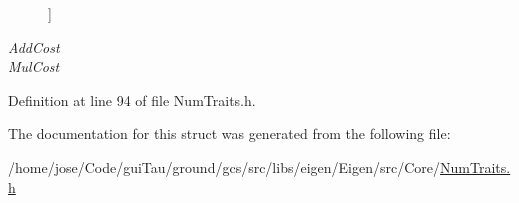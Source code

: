 \begin{Desc}
\begin{description}
{}]\item[{\em 
\hypertarget{struct_num_traits_3_01std_1_1complex_3_01___real_01_4_01_4_a871ff18c5ca0e6b22d90410aaf6b96c4a10d14e7883002df66df773824785c86b}{Add\-Cost}\label{struct_num_traits_3_01std_1_1complex_3_01___real_01_4_01_4_a871ff18c5ca0e6b22d90410aaf6b96c4a10d14e7883002df66df773824785c86b}
}]\item[{\em 
\hypertarget{struct_num_traits_3_01std_1_1complex_3_01___real_01_4_01_4_a871ff18c5ca0e6b22d90410aaf6b96c4a4adb121abc42ede778cae2652809088a}{Mul\-Cost}\label{struct_num_traits_3_01std_1_1complex_3_01___real_01_4_01_4_a871ff18c5ca0e6b22d90410aaf6b96c4a4adb121abc42ede778cae2652809088a}
}]\end{description}
\end{Desc}


Definition at line 94 of file Num\-Traits.\-h.



The documentation for this struct was generated from the following file\-:\begin{DoxyCompactItemize}
\item 
/home/jose/\-Code/gui\-Tau/ground/gcs/src/libs/eigen/\-Eigen/src/\-Core/\hyperlink{_num_traits_8h}{Num\-Traits.\-h}\end{DoxyCompactItemize}
